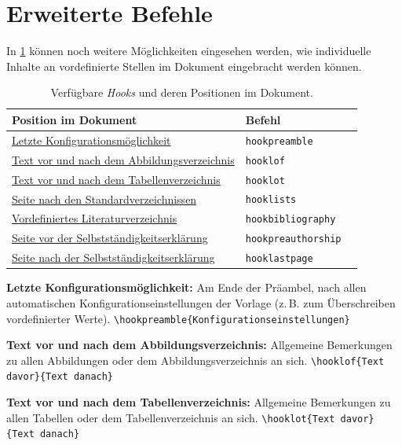 \section{Erweiterte Befehle}
	In \cref{tab:hooks} können noch weitere Möglichkeiten eingesehen werden, wie individuelle Inhalte an vordefinierte Stellen im Dokument eingebracht werden können.
	
	\begin{table}[!htb]
		\centering
		\caption{Verfügbare \textit{Hooks} und deren Positionen im Dokument.}
		\label{tab:hooks}
		\begin{tabular}{lll}
			\toprule
			\textbf{Position im Dokument} & \textbf{Befehl} \\
			\midrule
			\hyperref[cmd:hookpreamble]{Letzte Konfigurationsmöglichkeit} & \texttt{hookpreamble} \\
			\hyperref[cmd:hooklof]{Text vor und nach dem Abbildungsverzeichnis} & \texttt{hooklof} \\
			\hyperref[cmd:hooklot]{Text vor und nach dem Tabellenverzeichnis} & \texttt{hooklot} \\
			\hyperref[cmd:hooklists]{Seite nach den Standardverzeichnissen} & \texttt{hooklists} \\
			\hyperref[cmd:hookbibliography]{Vordefiniertes Literaturverzeichnis} & \texttt{hookbibliography} \\
			\hyperref[cmd:hookpreauthorship]{Seite vor der Selbstständigkeitserklärung} & \texttt{hookpreauthorship} \\
			\hyperref[cmd:hooklastpage]{Seite nach der Selbstständigkeitserklärung} & \texttt{hooklastpage} \\	
			\bottomrule
		\end{tabular}
	\end{table}
	
	\textbf{Letzte Konfigurationsmöglichkeit:}\label{cmd:hookpreamble}
	Am Ende der Präambel, nach allen automatischen Konfigurationseinstellungen der Vorlage (z.\,B. zum Überschreiben vordefinierter Werte).
	\newline
	\verb|\hookpreamble{Konfigurationseinstellungen}|
	
	\textbf{Text vor und nach dem Abbildungsverzeichnis:}\label{cmd:hooklof}
	Allgemeine Bemerkungen zu allen Abbildungen oder dem Abbildungsverzeichnis an sich.
	\newline
	\verb|\hooklof{Text davor}{Text danach}|
	
	\textbf{Text vor und nach dem Tabellenverzeichnis:}\label{cmd:hooklot}
	Allgemeine Bemerkungen zu allen Tabellen oder dem Tabellenverzeichnis an sich.
	\newline
	\verb|\hooklot{Text davor}{Text danach}|
	
